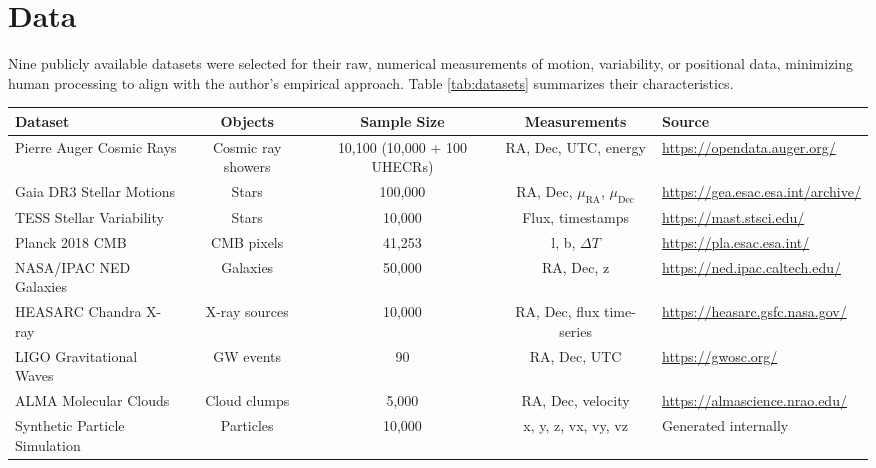 \documentclass[12pt, twocolumn]{article}
\begin{document}
\section{Data}
\label{sec:data}
Nine publicly available datasets were selected for their raw, numerical measurements of motion, variability, or positional data, minimizing human processing to align with the author’s empirical approach. Table \ref{tab:datasets} summarizes their characteristics.

\begin{table*}
\centering
\caption{Summary of Datasets Used to Validate the Cosmic Motion Symphony}
\label{tab:datasets}
\begin{tabular}{l c c c l}
\toprule
Dataset & Objects & Sample Size & Measurements & Source \\
\midrule
Pierre Auger Cosmic Rays & Cosmic ray showers & 10,100 (10,000 + 100 UHECRs) & RA, Dec, UTC, energy & \url{https://opendata.auger.org/} \\
Gaia DR3 Stellar Motions & Stars & 100,000 & RA, Dec, $\mu_{\text{RA}}$, $\mu_{\text{Dec}}$ & \url{https://gea.esac.esa.int/archive/} \\
TESS Stellar Variability & Stars & 10,000 & Flux, timestamps & \url{https://mast.stsci.edu/} \\
Planck 2018 CMB & CMB pixels & 41,253 & l, b, $\Delta T$ & \url{https://pla.esac.esa.int/} \\
NASA/IPAC NED Galaxies & Galaxies & 50,000 & RA, Dec, z & \url{https://ned.ipac.caltech.edu/} \\
HEASARC Chandra X-ray & X-ray sources & 10,000 & RA, Dec, flux time-series & \url{https://heasarc.gsfc.nasa.gov/} \\
LIGO Gravitational Waves & GW events & 90 & RA, Dec, UTC & \url{https://gwosc.org/} \\
ALMA Molecular Clouds & Cloud clumps & 5,000 & RA, Dec, velocity & \url{https://almascience.nrao.edu/} \\
Synthetic Particle Simulation & Particles & 10,000 & x, y, z, vx, vy, vz & Generated internally \\
\bottomrule
\end{tabular}
\end{table*}
\end{document}
